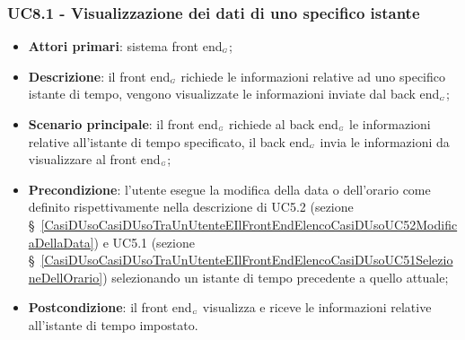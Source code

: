 \subsubsection{UC8.1 - Visualizzazione dei dati di uno specifico istante}\label{CasiDUsoCasiDUsoTraIlFrontEndEIlBackEndElencoDeiCasiDUsoUC81VisualizzazioneDeiDatiDiUnoSpecificoIstante}
\begin{itemize}
	\item \textbf{Attori primari}: sistema front end$_{\scaleto{G}{3pt}}$;
	\item \textbf{Descrizione}: il front end$_{\scaleto{G}{3pt}}$ richiede le informazioni relative ad uno specifico istante di tempo, vengono visualizzate le informazioni inviate dal back end$_{\scaleto{G}{3pt}}$;
	\item \textbf{Scenario principale}:  il front end$_{\scaleto{G}{3pt}}$ richiede al back end$_{\scaleto{G}{3pt}}$ le informazioni relative all'istante di tempo specificato, il back end$_{\scaleto{G}{3pt}}$ invia le informazioni da visualizzare al front end$_{\scaleto{G}{3pt}}$;
	\item \textbf{Precondizione}: l’utente esegue la modifica della data o dell’orario come definito rispettivamente nella descrizione di UC5.2 (sezione \S~\ref{CasiDUsoCasiDUsoTraUnUtenteEIlFrontEndElencoCasiDUsoUC52ModificaDellaData}) e UC5.1 (sezione \S~\ref{CasiDUsoCasiDUsoTraUnUtenteEIlFrontEndElencoCasiDUsoUC51SelezioneDellOrario}) selezionando un istante di tempo precedente a quello attuale;
	\item \textbf{Postcondizione}: il front end$_{\scaleto{G}{3pt}}$ visualizza e riceve le informazioni relative all'istante di tempo impostato.
\end{itemize}

